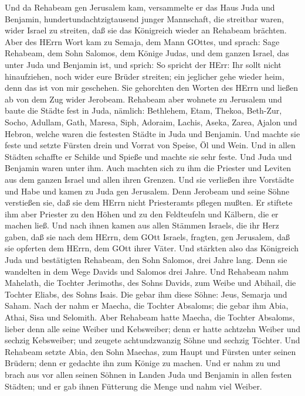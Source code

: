  Und da Rehabeam gen Jerusalem kam, versammelte er das Haus
Juda und Benjamin, hundertundachtzigtausend junger Mannschaft, die
streitbar waren, wider Israel zu streiten, daß sie das Königreich wieder
an Rehabeam brächten.  Aber des HErrn Wort kam zu Semaja,
dem Mann GOttes, und sprach:  Sage Rehabeam, dem Sohn
Salomos, dem Könige Judas, und dem ganzen Israel, das unter Juda und
Benjamin ist, und sprich:  So spricht der HErr: Ihr sollt
nicht hinaufziehen, noch wider eure Brüder streiten; ein jeglicher gehe
wieder heim, denn das ist von mir geschehen. Sie gehorchten den Worten
des HErrn und ließen ab von dem Zug wider Jerobeam. 
Rehabeam aber wohnete zu Jerusalem und baute die Städte fest in Juda,
 nämlich: Bethlehem, Etam, Thekoa,  Beth-Zur,
Socho, Adullam,  Gath, Maresa, Siph,  Adoraim,
Lachis, Aseka,  Zarea, Ajalon und Hebron, welche waren die
festesten Städte in Juda und Benjamin.  Und machte sie
feste und setzte Fürsten drein und Vorrat von Speise, Öl und Wein.
 Und in allen Städten schaffte er Schilde und Spieße und
machte sie sehr feste. Und Juda und Benjamin waren unter ihm.
 Auch machten sich zu ihm die Priester und Leviten aus dem
ganzen Israel und allen ihren Grenzen.  Und sie verließen
ihre Vorstädte und Habe und kamen zu Juda gen Jerusalem. Denn Jerobeam
und seine Söhne verstießen sie, daß sie dem HErrn nicht Priesteramts
pflegen mußten.  Er stiftete ihm aber Priester zu den Höhen
und zu den Feldteufeln und Kälbern, die er machen ließ. 
Und nach ihnen kamen aus allen Stämmen Israels, die ihr Herz gaben, daß
sie nach dem HErrn, dem GOtt Israels, fragten, gen Jerusalem, daß sie
opferten dem HErrn, dem GOtt ihrer Väter.  Und stärkten
also das Königreich Juda und bestätigten Rehabeam, den Sohn Salomos,
drei Jahre lang. Denn sie wandelten in dem Wege Davids und Salomos drei
Jahre.  Und Rehabeam nahm Mahelath, die Tochter Jerimoths,
des Sohns Davids, zum Weibe und Abihail, die Tochter Eliabs, des Sohns
Isais.  Die gebar ihm diese Söhne: Jeus, Semarja und Saham.
 Nach der nahm er Maecha, die Tochter Absaloms; die gebar
ihm Abia, Athai, Sisa und Selomith.  Aber Rehabeam hatte
Maecha, die Tochter Absaloms, lieber denn alle seine Weiber und
Kebsweiber; denn er hatte achtzehn Weiber und sechzig Kebsweiber; und
zeugete achtundzwanzig Söhne und sechzig Töchter.  Und
Rehabeam setzte Abia, den Sohn Maechas, zum Haupt und Fürsten unter
seinen Brüdern; denn er gedachte ihn zum Könige zu machen. 
Und er nahm zu und brach aus vor allen seinen Söhnen in Landen Juda und
Benjamin in allen festen Städten; und er gab ihnen Fütterung die Menge
und nahm viel Weiber.

